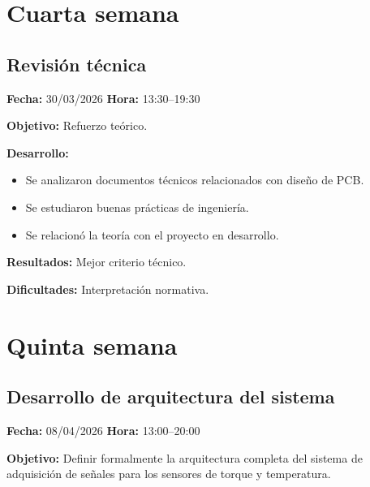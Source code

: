 \documentclass[12pt]{article}
\begin{document}
\section{Cuarta semana}

\subsection{Revisión técnica}
\textbf{Fecha:} 30/03/2026 \quad \textbf{Hora:} 13:30--19:30

\textbf{Objetivo:}
Refuerzo teórico.

\textbf{Desarrollo:}
\begin{itemize}
\item Se analizaron documentos técnicos relacionados con diseño de PCB.
\item Se estudiaron buenas prácticas de ingeniería.
\item Se relacionó la teoría con el proyecto en desarrollo.
\end{itemize}

\textbf{Resultados:}
Mejor criterio técnico.

\textbf{Dificultades:}
Interpretación normativa.

\section{Quinta semana}

\subsection{Desarrollo de arquitectura del sistema}
\textbf{Fecha:} 08/04/2026 \quad \textbf{Hora:} 13:00--20:00

\textbf{Objetivo:}
Definir formalmente la arquitectura completa del sistema de adquisición de señales para los sensores de torque y temperatura.
\end{document}
